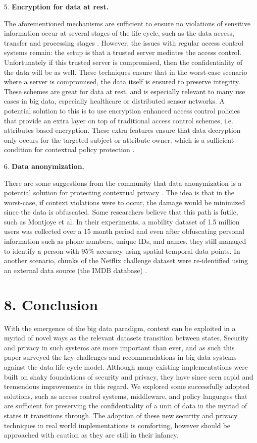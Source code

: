 \documentclass{sigchi}
\begin{document}
5. \textbf{Encryption for data at rest.}

The aforementioned mechanisms are sufficient to ensure no violations of sensitive information occur at several stages of the life cycle, such as the data access, transfer and processing stages \cite{demchenko2013big}. However, the issues with regular access control systems remain: the setup is that a trusted server mediates the access control. Unfortunately if this trusted server is compromised, then the confidentiality of the data will be as well. These techniques ensure that in the worst-case scenario where a server is compromised, the data itself is ensured to preserve integrity. These schemes are great for data at rest, and is especially relevant to many use cases in big data, especially healthcare or distributed sensor networks. A potential solution to this is to use encryption enhanced access control policies that provide an extra layer on top of traditional access control schemes, i.e. attributes based encryption. These extra features ensure that data decryption only occurs for the targeted subject or attribute owner, which is a sufficient condition for contextual policy protection \cite{goyal2006attribute}.

6. \textbf{Data anonymization.}

There are some suggestions from the community that data anonymization is a potential solution for protecting contextual privacy \cite{cormode2009anonymized}. The idea is that in the worst-case, if context violations were to occur, the damage would be minimized since the data is obfuscated. Some researchers believe that this path is futile, such as Montjoye et al\cite{de2013unique}. In their experiments, a mobility dataset of 1.5 million users was collected over a 15 month period and even after obfuscating personal information such as phone numbers, unique IDs, and names, they still managed to identify a person with 95\% accuracy using spatial-temporal data points. In another scenario, chunks of the Netflix challenge dataset were re-identified using an external data source (the IMDB database) \cite{narayanan2008robust}.

\section{8. Conclusion}

With the emergence of the big data paradigm, context can be exploited in a myriad of novel ways as the relevant datasets transition between states. Security and privacy in such systems are more important than ever, and as such this paper surveyed the key challenges and recommendations in big data systems against the data life cycle model. Although many existing implementations were built on shaky foundations of security and privacy, they have since seen rapid and tremendous improvements in this regard. We explored some successfully adopted solutions, such as access control systems, middleware, and policy languages that are sufficient for preserving the confidentiality of a unit of data in the myriad of states it transitions through. The adoption of these new security and privacy techniques in real world implementations is comforting, however should be approached with caution as they are still in their infancy.
\end{document}
